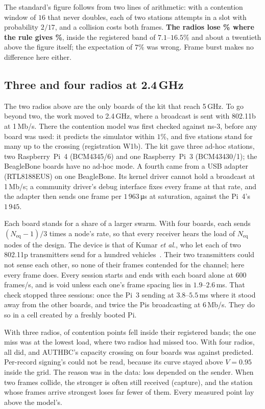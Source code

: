 The standard's figure follows from two lines of arithmetic: with a contention window of $16$
that never doubles, each of two stations attempts in a slot with probability $2/17$, and a
collision costs both frames. \textbf{The radios lose \hwSatOff\% where the rule gives
\hwSatStd\%}, inside the registered band of $7.1$--$16.5\%$ and about a twentieth above the figure
itself; the expectation of $7\%$ was wrong. Frame burst makes no difference here either.

\subsection{Three and four radios at 2.4\,GHz}\label{sec:four-radios}

The two radios above are the only boards of the kit that reach 5\,GHz. To go beyond two, the
work moved to 2.4\,GHz, where a broadcast is sent with 802.11b at 1\,Mb/s. There the contention
model was first checked against ns-3, before any board was used: it predicts the simulator within
$1\%$, and five stations stand for many up to the crossing (registration W1b). The kit gave three
ad-hoc stations, two Raspberry~Pi~4 (BCM4345/6) and one Raspberry~Pi~3 (BCM43430/1); the
BeagleBone boards have no ad-hoc mode. A fourth came from a USB adapter (RTL8188EUS) on one
BeagleBone. Its kernel driver cannot hold a broadcast at 1\,Mb/s; a community driver's debug
interface fixes every frame at that rate, and the adapter then sends one frame per
$1\,963$\,\si{\micro\second} at saturation, against the Pi~4's $1\,945$.

Each board stands for a share of a larger swarm. With four boards, each sends $(N_{\mathrm{eq}}-1)/3$
times a node's rate, so that every receiver hears the load of $N_{\mathrm{eq}}$ nodes of the
design. The device is that of Kumar \emph{et al.}, who let each of two 802.11p transmitters send
for a hundred vehicles~\cite{kumar2019hidden}. Their two transmitters could not sense each
other, so none of their frames contended for the channel; here every frame does. Every session
starts and ends with each board alone at 600 frames/s, and is void unless
each one's frame spacing lies in $1.9$--$2.6$\,ms. That check stopped three sessions: once the Pi~3
sending at $3.8$--$5.5$\,ms where it stood away from the other boards, and twice the Pis
broadcasting at 6\,Mb/s. They do so in a cell created by a freshly booted Pi.

With three radios, \hwThreeHeld{} of \hwThreePoints{} contention points fell inside their
registered bands; the one miss was at the lowest load, where two radios had missed too. With four
radios, all \hwFourPoints{} did, and AUTHBC's capacity crossing on four boards was \hwFourCrossA{}
against \hwModelCrossA{} predicted. Per-record signing's could not be read, because its curve stayed
above $V = 0.95$ inside the grid. The reason was in the data: loss depended on the sender. When two
frames collide, the stronger is often still received (capture), and the station whose frames
arrive strongest loses far fewer of them. Every measured point lay above the model's.

